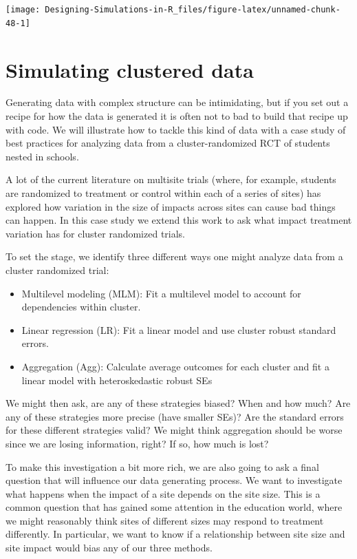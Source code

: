 \documentclass[
]{book}
\providecommand{\tightlist}{%
  \setlength{\itemsep}{0pt}\setlength{\parskip}{0pt}}
\begin{document}
\begin{center}\texttt{[image: Designing-Simulations-in-R\_files/figure-latex/unnamed-chunk-48-1]} \end{center}

\hypertarget{case_cluster}{%
\section{Simulating clustered data}\label{case_cluster}}

Generating data with complex structure can be intimidating, but if you set out a recipe for how the data is generated it is often not to bad to build that recipe up with code.
We will illustrate how to tackle this kind of data with a case study of best practices for analyzing data from a cluster-randomized RCT of students nested in schools.

A lot of the current literature on multisite trials (where, for example, students are randomized to treatment or control within each of a series of sites) has explored how variation in the size of impacts across sites can cause bad things can happen.
In this case study we extend this work to ask what impact treatment variation has for cluster randomized trials.

To set the stage, we identify three different ways one might analyze data from a cluster randomized trial:

\begin{itemize}
\tightlist
\item
  Multilevel modeling (MLM): Fit a multilevel model to account for dependencies within cluster.
\item
  Linear regression (LR): Fit a linear model and use cluster robust standard errors.
\item
  Aggregation (Agg): Calculate average outcomes for each cluster and fit a linear model with heteroskedastic robust SEs
\end{itemize}

We might then ask, are any of these strategies biased? When and how much?
Are any of these strategies more precise (have smaller SEs)?
Are the standard errors for these different strategies valid?
We might think aggregation should be worse since we are losing information, right?
If so, how much is lost?

To make this investigation a bit more rich, we are also going to ask a final question that will influence our data generating process.
We want to investigate what happens when the impact of a site depends on the site size.
This is a common question that has gained some attention in the education world, where we might reasonably think sites of different sizes may respond to treatment differently.
In particular, we want to know if a relationship between site size and site impact would bias any of our three methods.
\end{document}
